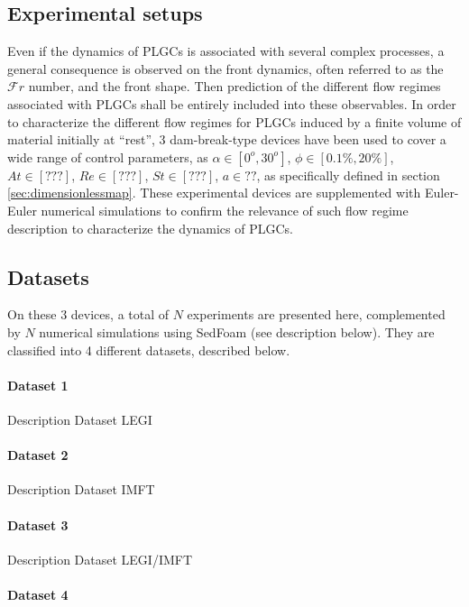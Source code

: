 \documentclass[twocolumn]{article}
\begin{document}
\subsection{Experimental setups}

Even if the dynamics of PLGCs is associated with several complex processes, a general consequence is observed on the front dynamics, often referred to as the $\mathcal{F}r$ number, and the front shape. Then prediction of the different flow regimes associated with PLGCs shall be entirely included into these observables. In order to characterize the different flow regimes for PLGCs induced by a finite volume of material initially at “rest”, 3 dam-break-type devices have been used to cover a wide range of control parameters, as $\alpha \in [0^o,30^o]$, $\phi\in[0.1\%,20\%]$, $At\in[???]$, $Re\in[???]$, $St\in[???]$, $a\in??$, as specifically defined in section \ref{sec:dimensionlessmap}. These experimental devices are supplemented with Euler-Euler numerical simulations to confirm the relevance of such flow regime description to characterize the dynamics of PLGCs.

\subsection{Datasets}

On these 3 devices, a total of $N$ experiments are presented here, complemented by $N$ numerical simulations using SedFoam (see description below). They are classified into 4 different datasets, described below.

\paragraph{Dataset 1}

Description Dataset LEGI

\paragraph{Dataset 2}

Description Dataset IMFT

\paragraph{Dataset 3}

Description Dataset LEGI/IMFT

\paragraph{Dataset 4}
\end{document}
